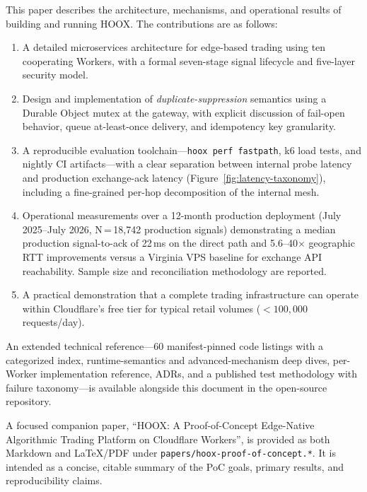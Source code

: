 This paper describes the architecture, mechanisms, and operational results of building and running \textsc{HOOX}. The contributions are as follows:
\begin{enumerate}
  \item A detailed microservices architecture for edge-based trading using ten cooperating Workers, with a formal seven-stage signal lifecycle and five-layer security model.
  \item Design and implementation of \emph{duplicate-suppression} semantics using a Durable Object mutex at the gateway, with explicit discussion of fail-open behavior, queue at-least-once delivery, and idempotency key granularity.
  \item A reproducible evaluation toolchain---\texttt{hoox perf fastpath}, k6 load tests, and nightly CI artifacts---with a clear separation between internal probe latency and production exchange-ack latency (Figure~\ref{fig:latency-taxonomy}), including a fine-grained per-hop decomposition of the internal mesh.
  \item Operational measurements over a 12-month production deployment (July 2025--July 2026, N\,=\,18{,}742 production signals) demonstrating a median production signal-to-ack of 22\,ms on the direct path and 5.6--40$\times$ geographic RTT improvements versus a Virginia VPS baseline for exchange API reachability. Sample size and reconciliation methodology are reported.
  \item A practical demonstration that a complete trading infrastructure can operate within Cloudflare's free tier for typical retail volumes (${<}100{,}000$ requests/day).
\end{enumerate}

An extended technical reference---60 manifest-pinned code listings with a categorized index, runtime-semantics and advanced-mechanism deep dives, per-Worker implementation reference, ADRs, and a published test methodology with failure taxonomy---is available alongside this document in the open-source repository.

A focused companion paper, ``HOOX: A Proof-of-Concept Edge-Native Algorithmic Trading Platform on Cloudflare Workers'', is provided as both Markdown and LaTeX/PDF under \texttt{papers/hoox-proof-of-concept.*}. It is intended as a concise, citable summary of the PoC goals, primary results, and reproducibility claims.
